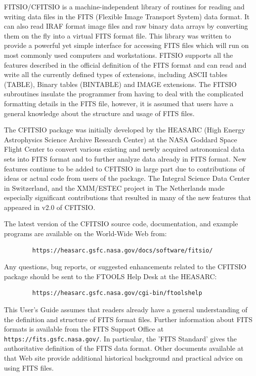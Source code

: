 \documentclass[11pt]{book}
\begin{document}
FITSIO/CFITSIO is a machine-independent library of routines for reading
and writing data files in the FITS (Flexible Image Transport System)
data format.  It can also read IRAF format image files and raw binary
data arrays by converting them on the fly into a virtual FITS format
file.  This library was written to provide a powerful yet simple
interface for accessing FITS files which will run on most commonly used
computers and workstations. FITSIO supports all the features described
in the official definition of the FITS format and can read and
write all the currently defined types of extensions, including ASCII
tables (TABLE), Binary tables (BINTABLE) and IMAGE extensions. The
FITSIO subroutines insulate the programmer from having to deal with the
complicated formatting details in the FITS file, however, it is assumed
that users have a general knowledge about the structure and usage of
FITS files.

The CFITSIO package was initially developed by the HEASARC (High Energy
Astrophysics Science Archive Research Center) at the NASA Goddard Space
Flight Center to convert various existing and newly acquired
astronomical data sets into FITS format and to further analyze data
already in FITS format.  New features continue to be added to CFITSIO
in large part due to contributions of ideas or actual code from users
of the package.  The Integral Science Data Center in Switzerland, and
the XMM/ESTEC project in The Netherlands made especially significant
contributions that resulted in many of the new features that appeared
in v2.0 of CFITSIO.

The latest version of the CFITSIO source code, documentation, and
example programs are available on the World-Wide Web from:

\begin{verbatim}
        https://heasarc.gsfc.nasa.gov/docs/software/fitsio/
\end{verbatim}
\newpage
Any questions, bug reports, or suggested enhancements related to the CFITSIO
package should be sent to the FTOOLS Help Desk at the HEASARC:

\begin{verbatim}
        https://heasarc.gsfc.nasa.gov/cgi-bin/ftoolshelp
\end{verbatim}

This User's Guide assumes that readers already have a general
understanding of the definition and structure of FITS format files.
Further information about FITS formats is available from the FITS Support
Office at {\tt https://fits.gsfc.nasa.gov/}.  In particular, the
'FITS Standard' gives the authoritative definition of the FITS data
format.  Other documents available at that Web site
provide additional historical background
and practical advice on using FITS files.
\end{document}
